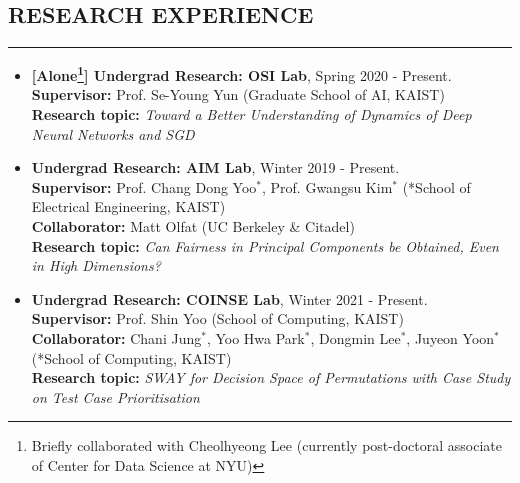\documentclass[10pt,a4]{article}
\begin{document}
\begin{small}

\subsection*{RESEARCH EXPERIENCE}
\hrule
\vspace{0.2cm}
\begin{itemize}
  
 \item 
 	{\bf [Alone\footnote{Briefly collaborated with Cheolhyeong Lee (currently post-doctoral associate of Center for Data Science at NYU)}] Undergrad Research: OSI Lab}, Spring 2020 - Present. \\
 {\bf Supervisor:} Prof. Se-Young Yun (Graduate School of AI, KAIST) \\
 {\bf Research topic:} {\it Toward a Better Understanding of Dynamics of Deep Neural Networks and SGD } \\


 \item {\bf Undergrad Research:
  AIM Lab}, Winter 2019 - Present. \\
 {\bf Supervisor:} Prof. Chang Dong Yoo$^{*}$, Prof. Gwangsu Kim$^{*}$ (*School of Electrical Engineering, KAIST) \\
 {\bf Collaborator:} Matt Olfat (UC Berkeley \& Citadel) \\
 {\bf Research topic:} {\it Can Fairness in Principal Components be Obtained, Even in High Dimensions?} \\

 \item {\bf Undergrad Research: COINSE Lab}, Winter 2021 - Present. \\
{\bf Supervisor:} Prof. Shin Yoo (School of Computing, KAIST) \\
 {\bf Collaborator:} Chani Jung$^{*}$, Yoo Hwa Park$^{*}$, Dongmin Lee$^{*}$, Juyeon Yoon$^{*}$ (*School of Computing, KAIST) \\
{\bf Research topic:} {\it SWAY for Decision Space of Permutations with Case Study on Test Case Prioritisation } \\


\end{itemize}
\end{small}
\end{document}

